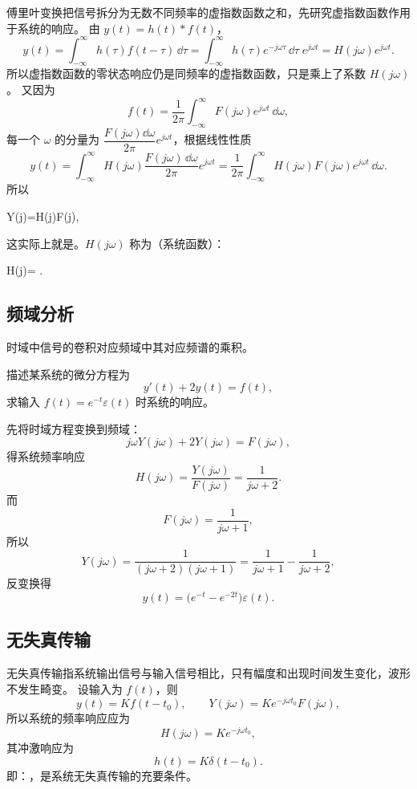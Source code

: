 傅里叶变换把信号拆分为无数不同频率的虚指数函数之和，先研究虚指数函数作用于系统的响应。
由 $y(t)=h(t)*f(t)$，
\[
    y(t)=\int_{-\infty}^{\infty}h(\tau)f(t-\tau)\,\dd\tau
    =\int_{-\infty}^{\infty}h(\tau)e^{-j\omega\tau}\,\dd\tau\;e^{j\omega t}
    =H(j\omega)e^{j\omega t}.
\]
所以虚指数函数的零状态响应仍是同频率的虚指数函数，只是乘上了系数 $H(j\omega)$。
又因为
\[
    f(t)=\frac{1}{2\pi}\int_{-\infty}^{\infty}F(j\omega)e^{j\omega t}\,\dd\omega,
\]
每一个 $\omega$ 的分量为 $\dfrac{F(j\omega)\dd\omega}{2\pi}e^{j\omega t}$，根据线性性质
\[
    y(t)=\int_{-\infty}^{\infty}H(j\omega)\frac{F(j\omega)\,\dd\omega}{2\pi}e^{j\omega t}
    =\frac{1}{2\pi}\int_{-\infty}^{\infty}H(j\omega)F(j\omega)e^{j\omega t}\,\dd\omega .
\]
所以
\begin{keyeq}
    Y(j\omega)=H(j\omega)F(j\omega),
\end{keyeq}
这实际上就是。$H(j\omega)$ 称为（系统函数）：
\begin{keyeq}
    H(j\omega)= .
\end{keyeq}

\subsection{频域分析}

时域中信号的卷积对应频域中其对应频谱的乘积。

\begin{note}
\quad 描述某系统的微分方程为
\[
    y'(t)+2y(t)=f(t),
\]
求输入 $f(t)=e^{-t}\varepsilon(t)$ 时系统的响应。

\quad 先将时域方程变换到频域：
\[
    j\omega Y(j\omega)+2Y(j\omega)=F(j\omega),
\]
得系统频率响应
\[
    H(j\omega)=\frac{Y(j\omega)}{F(j\omega)}=\frac{1}{j\omega+2}.
\]
而
\[
    F(j\omega)=\frac{1}{j\omega+1},
\]
所以
\[
    Y(j\omega)=\frac{1}{(j\omega+2)(j\omega+1)}
    =\frac{1}{j\omega+1}-\frac{1}{j\omega+2},
\]
反变换得
\[
    y(t)=\bigl(e^{-t}-e^{-2t}\bigr)\varepsilon(t).
\]
\end{note}

\subsection{无失真传输}

无失真传输指系统输出信号与输入信号相比，只有幅度和出现时间发生变化，波形不发生畸变。
设输入为 $f(t)$，则
\[
    y(t)=Kf(t-t_0),
    \qquad
    Y(j\omega)=Ke^{-j\omega t_0}F(j\omega),
\]
所以系统的频率响应应为
\[
    H(j\omega)=Ke^{-j\omega t_0},
\]
其冲激响应为
\[
    h(t)=K\delta(t-t_0).
\]
即：，是系统无失真传输的充要条件。

